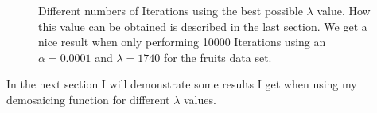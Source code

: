\documentclass{paper}
\begin{document}
\begin{figure}[H]
\begin{center}
{   \label{fig:subfig1111}
 }
\end{center}
\caption{Different numbers of Iterations using the best possible $\lambda$ value. How this value can be obtained is described in the last section. We get a nice result when only performing 10000 Iterations using an $\alpha=0.0001$ and $\lambda = 1740$ for the fruits data set.}
\label{fig:different_iters_for_best_lambda}
\end{figure}

In the next section I will demonstrate some results I get when using my demosaicing function for different $\lambda$ values. 
\end{document}
